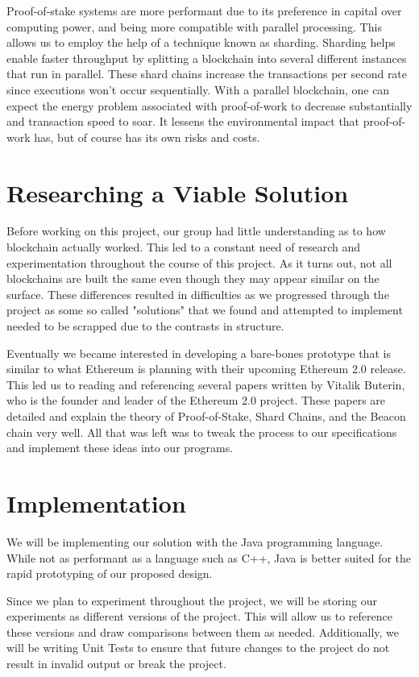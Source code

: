 Proof-of-stake systems are more performant due to its preference in capital over computing power, and being more compatible with parallel processing. This allows us to employ the help of a technique known as sharding. Sharding helps enable faster throughput by splitting a blockchain into several different instances that run in parallel. These shard chains increase the transactions per second rate since executions won’t occur sequentially. With a parallel blockchain, one can expect the energy problem associated with proof-of-work to decrease substantially and transaction speed to soar. It lessens the environmental impact that proof-of-work has, but of course has its own risks and costs.

\section{Researching a Viable Solution}

Before working on this project, our group had little understanding as to how blockchain actually worked. This led to a constant need of research and experimentation throughout the course of this project. As it turns out, not all blockchains are built the same even though they may appear similar on the surface. These differences resulted in difficulties as we progressed through the project as some so called "solutions" that we found and attempted to implement needed to be scrapped due to the contrasts in structure.

Eventually we became interested in developing a bare-bones prototype that is similar to what Ethereum is planning with their upcoming Ethereum 2.0 release. This led us to reading and referencing several papers written by Vitalik Buterin, who is the founder and leader of the Ethereum 2.0 project. These papers are detailed and explain the theory of Proof-of-Stake, Shard Chains, and the Beacon chain very well. All that was left was to tweak the process to our specifications and implement these ideas into our programs.

\section{Implementation}

We will be implementing our solution with the Java programming language. While not as performant as a language such as C++, Java is better suited for the rapid prototyping of our proposed design.

Since we plan to experiment throughout the project, we will be storing our experiments as different versions of the project. This will allow us to reference these versions and draw comparisons between them as needed.
Additionally, we will be writing Unit Tests to ensure that future changes to the project do not result in invalid output or break the project.

